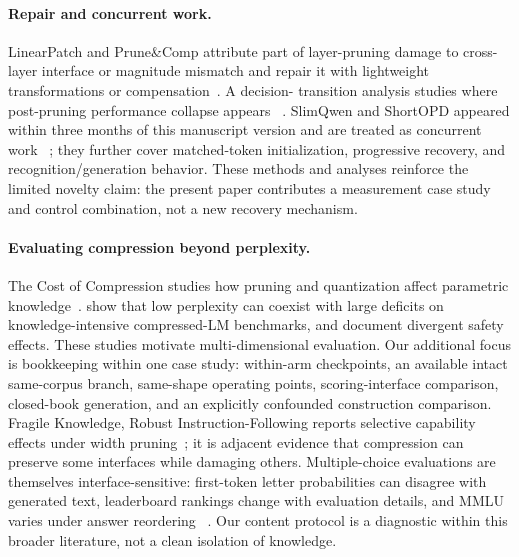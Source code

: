 \paragraph{Repair and concurrent work.}
LinearPatch and Prune\&Comp attribute part of layer-pruning damage to
cross-layer interface or magnitude mismatch and repair it with lightweight
transformations or compensation~\citep{linearpatch,prunecomp}. A decision-
transition analysis studies where post-pruning performance collapse appears
~\citep{decisioncollapse}. SlimQwen and ShortOPD appeared within three months of
this manuscript version and are treated as concurrent work
~\citep{slimqwen,shortopd}; they further cover matched-token initialization,
progressive recovery, and recognition/generation behavior. These methods and
analyses reinforce the limited novelty claim: the present paper contributes a
measurement case study and control combination, not a new recovery mechanism.

\paragraph{Evaluating compression beyond perplexity.}
The Cost of Compression studies how pruning and quantization affect parametric
knowledge~\citep{costcompression}. \citet{jaiswal2024truth} show that low
perplexity can coexist with large deficits on knowledge-intensive compressed-LM
benchmarks, and \citet{beyondperplexity} document divergent safety effects.
These studies motivate multi-dimensional evaluation. Our additional focus is
bookkeeping within one case study: within-arm checkpoints, an available intact
same-corpus branch, same-shape operating points, scoring-interface comparison,
closed-book generation, and an explicitly confounded construction comparison.
Fragile Knowledge, Robust Instruction-Following reports selective capability
effects under width pruning~\citep{fragileknowledge}; it is adjacent evidence
that compression can preserve some interfaces while damaging others.
Multiple-choice evaluations are themselves interface-sensitive: first-token
letter probabilities can disagree with generated text, leaderboard rankings
change with evaluation details, and MMLU varies under answer reordering
~\citep{myanswerisc,benchmarktargets,answerorder}. Our content protocol is a
diagnostic within this broader literature, not a clean isolation of knowledge.
